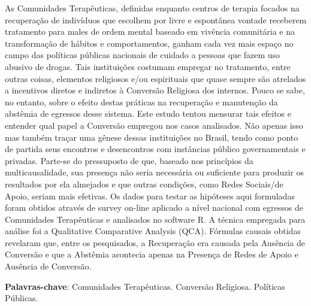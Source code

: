 \documentclass[
	12pt,				%
	oneside,			%
	a4paper,			%
	sumario=tradicional,
	english,			%
	brazil				%
	]{abntex2}
\begin{document}
\setlength{\absparsep}{18pt} %
\begin{resumo}
	\SingleSpacing
  As Comunidades Terapêuticas, definidas enquanto centros de terapia focados na recuperação de indivíduos que escolhem por livre e espontânea vontade receberem tratamento para males de ordem mental baseado em vivência comunitária e na transformação de hábitos e comportamentos, ganham cada vez mais espaço no campo das políticas públicas nacionais de cuidado a pessoas que fazem uso abusivo de drogas. Tais instituições costumam empregar no tratamento, entre outras coisas, elementos religiosos e/ou espirituais que quase sempre são atrelados a incentivos diretos e indiretos à Conversão Religiosa dos internos. Pouco se sabe, no entanto, sobre o efeito destas práticas na recuperação e manutenção da abstêmia de egressos desse sistema. Este estudo tentou mensurar tais efeitos e entender qual papel a Conversão empregou nos casos analisados. Não apenas isso mas também traçar uma gênese dessas instituições no Brasil, tendo como ponto de partida seus encontros e desencontros com instâncias público governamentais e privadas. Parte-se do pressuposto de que, baseado nos princípios da multicausalidade, sua presença não seria necessária ou suficiente para produzir os resultados por ela almejados e que outras condições, como Redes Sociais/de Apoio, seriam mais efetivas. Os dados para testar as hipóteses aqui formuladas foram obtidos através de survey on-line aplicado a nível nacional com egressos de Comunidades Terapêuticas e analisados no software R. A técnica empregada para análise foi a Qualitative Comparative Analysis (QCA). Fórmulas causais obtidas revelaram que, entre os pesquisados, a Recuperação era causada pela Ausência de Conversão e que a Abstêmia acontecia apenas na Presença de Redes de Apoio e Ausência de Conversão. 
  
  \textbf{Palavras-chave}: 
    Comunidades Terapêuticas.
    Conversão Religiosa.
    Políticas Públicas.
  \end{resumo}
\end{document}
